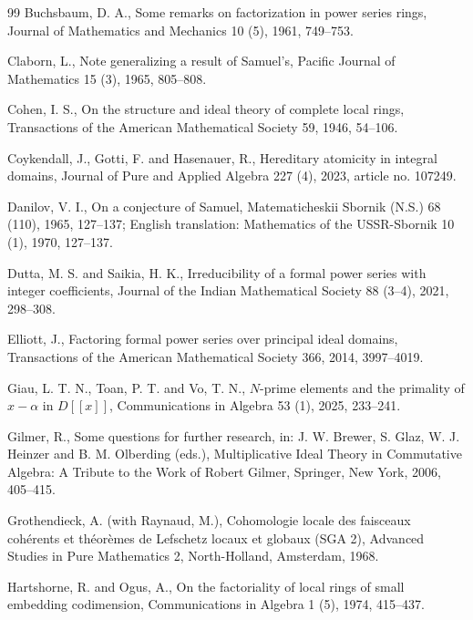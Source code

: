\documentclass{article}
\theoremstyle{plain}
\theoremstyle{definition}
\theoremstyle{remark}
\theoremstyle{plain}
\begin{document}
\begin{thebibliography}{99}
 Buchsbaum, D. A., Some remarks on factorization in power series rings, Journal of Mathematics and Mechanics 10 (5), 1961, 749--753.


 Claborn, L., Note generalizing a result of Samuel's, Pacific Journal of Mathematics 15 (3), 1965, 805--808.

 Cohen, I. S., On the structure and ideal theory of complete local rings, Transactions of the American Mathematical Society 59, 1946, 54--106.

 Coykendall, J., Gotti, F. and Hasenauer, R., Hereditary atomicity in integral domains, Journal of Pure and Applied Algebra 227 (4), 2023, article no. 107249.

 Danilov, V. I., On a conjecture of Samuel, Matematicheskii Sbornik (N.S.) 68 (110), 1965, 127--137; English translation: Mathematics of the USSR-Sbornik 10 (1), 1970, 127--137.

 Dutta, M. S. and Saikia, H. K., Irreducibility of a formal power series with integer coefficients, Journal of the Indian Mathematical Society 88 (3--4), 2021, 298--308.

 Elliott, J., Factoring formal power series over principal ideal domains, Transactions of the American Mathematical Society 366, 2014, 3997--4019.

 Giau, L. T. N., Toan, P. T. and Vo, T. N., $N$-prime elements and the primality of $x-\alpha$ in $D[[x]]$, Communications in Algebra 53 (1), 2025, 233--241.

 Gilmer, R., Some questions for further research, in: J. W. Brewer, S. Glaz, W. J. Heinzer and B. M. Olberding (eds.), Multiplicative Ideal Theory in Commutative Algebra: A Tribute to the Work of Robert Gilmer, Springer, New York, 2006, 405--415.

 Grothendieck, A. (with Raynaud, M.), Cohomologie locale des faisceaux coh\'erents et th\'eor\`emes de Lefschetz locaux et globaux (SGA 2), Advanced Studies in Pure Mathematics 2, North-Holland, Amsterdam, 1968.

 Hartshorne, R. and Ogus, A., On the factoriality of local rings of small embedding codimension, Communications in Algebra 1 (5), 1974, 415--437.


\end{thebibliography}
\end{document}
